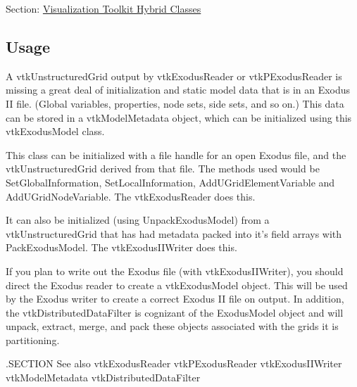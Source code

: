 Section\-: \hyperlink{sec_vtkhybrid}{Visualization Toolkit Hybrid Classes} \hypertarget{vtkwidgets_vtkxyplotwidget_Usage}{}\subsection{Usage}\label{vtkwidgets_vtkxyplotwidget_Usage}
A vtk\-Unstructured\-Grid output by vtk\-Exodus\-Reader or vtk\-P\-Exodus\-Reader is missing a great deal of initialization and static model data that is in an Exodus I\-I file. (Global variables, properties, node sets, side sets, and so on.) This data can be stored in a vtk\-Model\-Metadata object, which can be initialized using this vtk\-Exodus\-Model class.

This class can be initialized with a file handle for an open Exodus file, and the vtk\-Unstructured\-Grid derived from that file. The methods used would be Set\-Global\-Information, Set\-Local\-Information, Add\-U\-Grid\-Element\-Variable and Add\-U\-Grid\-Node\-Variable. The vtk\-Exodus\-Reader does this.

It can also be initialized (using Unpack\-Exodus\-Model) from a vtk\-Unstructured\-Grid that has had metadata packed into it's field arrays with Pack\-Exodus\-Model. The vtk\-Exodus\-I\-I\-Writer does this.

If you plan to write out the Exodus file (with vtk\-Exodus\-I\-I\-Writer), you should direct the Exodus reader to create a vtk\-Exodus\-Model object. This will be used by the Exodus writer to create a correct Exodus I\-I file on output. In addition, the vtk\-Distributed\-Data\-Filter is cognizant of the Exodus\-Model object and will unpack, extract, merge, and pack these objects associated with the grids it is partitioning.

.S\-E\-C\-T\-I\-O\-N See also vtk\-Exodus\-Reader vtk\-P\-Exodus\-Reader vtk\-Exodus\-I\-I\-Writer vtk\-Model\-Metadata vtk\-Distributed\-Data\-Filter

